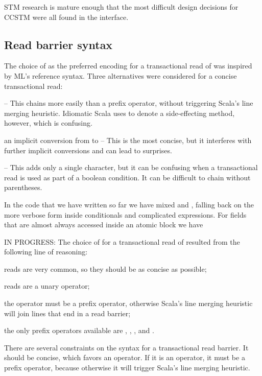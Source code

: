 
STM research is mature enough that the most difficult design decisions
for CCSTM were all found in the interface.

\subsection{Read barrier syntax}

The choice of  as the preferred encoding for a transactional
read of  was inspired by ML's reference syntax.  Three alternatives
were considered for a concise transactional read:
\begin{packed_enum}
\item {} -- This chains more easily than a prefix operator, without
triggering Scala's line merging heuristic.  Idiomatic Scala uses \code{()} to
denote a side-effecting method, however, which is confusing.
\item an implicit conversion from  to  -- This is
the most concise, but it interferes with further implicit conversions and
can lead to surprises.
\item {} -- This adds only a single character, but it can be
confusing when a transactional read is used as part of a boolean condition.
It can be difficult to chain without parentheses.
\end{packed_enum}

In the code that we have written so far we have mixed  and
, falling back on the more verbose form inside conditionals and
complicated expressions.  For fields that are almost always accessed inside
an atomic block we have 


IN PROGRESS:
The choice of  for a transactional read of  resulted
from the following line of reasoning:
\begin{packed_enum}
\item reads are very common, so they should be as concise as possible;
\item reads are a unary operator;
\item the operator must be a prefix operator, otherwise Scala's line merging
heuristic will join lines that end in a read barrier;
\item the only prefix operators available are \code{+}, \code{-},
\code{\textasciitilde}, and \code{!}.
\item {} 
\end{packed_enum}
There are several constraints on the syntax for a transactional read barrier.
It should be concise, which favors an operator.  If it is an operator, it must
be a prefix operator, because otherwise it will trigger Scala's line merging
heuristic.

